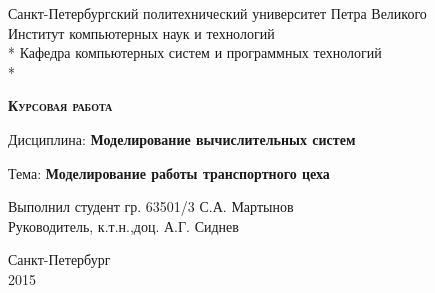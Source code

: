\begin{titlepage}
\thispagestyle{empty}

\begin{center}
Санкт-Петербургский политехнический университет Петра Великого\\
Институт компьютерных наук и технологий\\*
Кафедра компьютерных систем и программных технологий\\*
\hrulefill
\end{center}

\vspace{15em}

\begin{center}
\textsc{\textbf{Курсовая работа}}
\vspace{1em}

Дисциплина: \textbf{Моделирование вычислительных систем}
\vspace{2em}

Тема: \textbf{Моделирование работы транспортного цеха}
\end{center}

\vspace{16em}

\begin{flushleft}
Выполнил студент гр. 63501/3 \hrulefill С.А. Мартынов \\
\vspace{1.5em}
Руководитель, к.т.н.,доц. \hrulefill А.Г. Сиднев\\
\end{flushleft}

\vspace{\fill}

\begin{center}
Санкт-Петербург \\
2015
\end{center}

\end{titlepage}
\setcounter{page}{2}